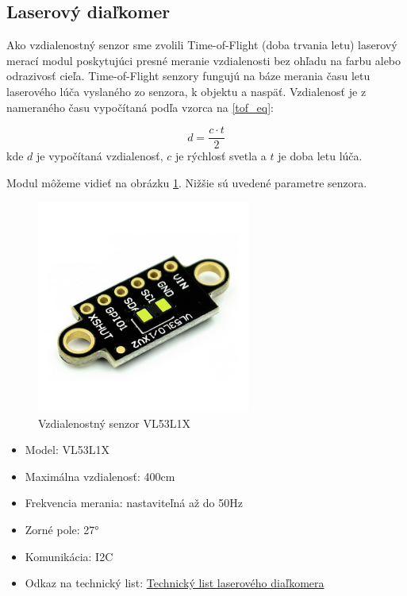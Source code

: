 \subsection{Laserový diaľkomer}
Ako vzdialenostný senzor sme zvolili Time-of-Flight (doba trvania letu) laserový merací modul poskytujúci presné meranie vzdialenosti bez ohľadu na farbu alebo odrazivosť cieľa. 
Time-of-Flight senzory fungujú na báze merania času letu laserového lúča vyslaného zo senzora, k objektu a naspäť. Vzdialenosť je z nameraného času vypočítaná podľa vzorca na \ref{tof_eq}:

\begin{equation}
\label{tof_eq}
d = \frac{c \cdot t}{2}
\end{equation}
kde $d$ je vypočítaná vzdialenosť, $c$ je rýchlosť svetla a $t$ je doba letu lúča.

Modul môžeme vidieť na obrázku  \ref{fig:vl53l1x}. Nižšie sú uvedené parametre senzora.
\begin{figure}[!htpb]
    \centering
    \includegraphics[width=7cm]{includes/images/vl53l1x.jpg}
    \caption{Vzdialenostný senzor VL53L1X}
    \label{fig:vl53l1x}
\end{figure}
\begin{itemize}

    \item Model: VL53L1X

    \item Maximálna vzdialenosť: 400cm

    \item Frekvencia merania: nastaviteľná až do 50Hz

    \item Zorné pole: 27°

    \item Komunikácia: I2C

    \item Odkaz na technický list: \href{https://www.st.com/resource/en/datasheet/vl53l1x.pdf}{Technický list laserového diaľkomera}

\end{itemize}



